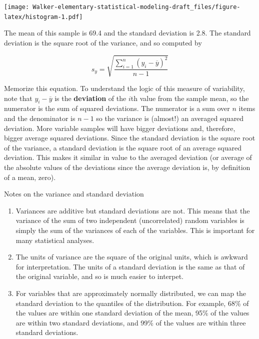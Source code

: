 \documentclass[]{book}
\providecommand{\tightlist}{%
  \setlength{\itemsep}{0pt}\setlength{\parskip}{0pt}}
\begin{document}
\texttt{[image: Walker-elementary-statistical-modeling-draft\_files/figure-latex/histogram-1.pdf]}

The mean of this sample is 69.4 and the standard deviation is 2.8. The
standard deviation is the square root of the variance, and so computed
by

\begin{equation}
s_y = \sqrt{\frac{\sum_{i=1}^n{(y_i - \overline{y})^2}}{n-1}}
\label{eq:variance}
\end{equation}

Memorize this equation. To understand the logic of this measure of
variability, note that \(y_i - \overline{y}\) is the \textbf{deviation}
of the \(i\)th value from the sample mean, so the numerator is the sum
of squared deviations. The numerator is a sum over \(n\) items and the
denominator is \(n-1\) so the variance is (almost!) an averaged squared
deviation. More variable samples will have bigger deviations and,
therefore, bigger average squared deviations. Since the standard
deviation is the square root of the variance, a standard deviation is
the square root of an average squared deviation. This makes it similar
in value to the averaged deviation (or average of the absolute values of
the deviations since the average deviation is, by definition of a mean,
zero).

Notes on the variance and standard deviation

\begin{enumerate}
\def\labelenumi{\arabic{enumi}.}
\tightlist
\item
  Variances are additive but standard deviations are not. This means
  that the variance of the sum of two independent (uncorrelated) random
  variables is simply the sum of the variances of each of the variables.
  This is important for many statistical analyses.
\item
  The units of variance are the square of the original units, which is
  awkward for interpretation. The units of a standard deviation is the
  same as that of the original variable, and so is much easier to
  interpet.
\item
  For variables that are approximately normally distributed, we can map
  the standard deviation to the quantiles of the distribution. For
  example, 68\% of the values are within one standard deviation of the
  mean, 95\% of the values are within two standard deviations, and 99\%
  of the values are within three standard deviations.
\end{enumerate}
\end{document}
